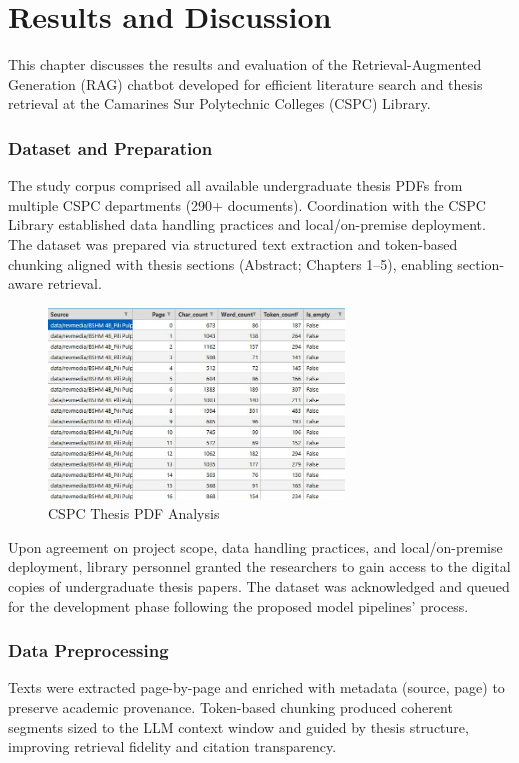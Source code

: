 \chapter{Results and Discussion}
\begin{refsection}

This chapter discusses the results and evaluation of the Retrieval-Augmented Generation (RAG) chatbot developed for efficient literature search and thesis retrieval at the Camarines Sur Polytechnic Colleges (CSPC) Library.

\subsection{Dataset and Preparation}
The study corpus comprised all available undergraduate thesis PDFs from multiple CSPC departments (290+ documents). Coordination with the CSPC Library established data handling practices and local/on-premise deployment. The dataset was prepared via structured text extraction and token-based chunking aligned with thesis sections (Abstract; Chapters 1--5), enabling section-aware retrieval.


\begin{figure}[h]
    \centering
    \includegraphics[width=0.7\textwidth]{figures/doc_analysis.jpg}
    \caption{CSPC Thesis PDF Analysis}
\end{figure}

Upon agreement on project scope, data handling practices, and local/on-premise deployment, library personnel granted the researchers to gain access to the digital copies of undergraduate thesis papers. The dataset was acknowledged and queued for the development phase following the proposed model pipelines’ process.

\subsection{Data Preprocessing}
Texts were extracted page-by-page and enriched with metadata (source, page) to preserve academic provenance. Token-based chunking produced coherent segments sized to the LLM context window and guided by thesis structure, improving retrieval fidelity and citation transparency.


\end{refsection}
